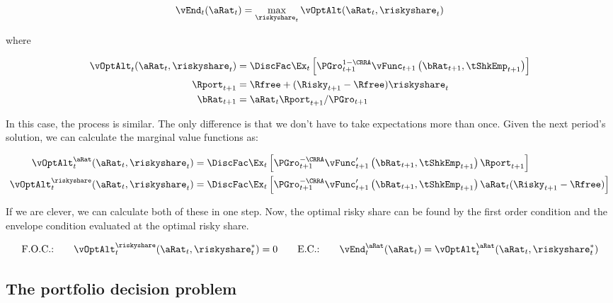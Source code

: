 \documentclass[\econtexRoot/SequentialEGM]{subfiles}
\begin{document}
\begin{equation}
        \vEnd_{t}(\aRat_{t}) = \max_{\riskyshare_{t}} \vOptAlt(\aRat_{t}, \riskyshare_{t})
\end{equation}

where

\begin{equation}
        \begin{split}
                \vOptAlt_{t}(\aRat_{t}, \riskyshare_{t}) & = \DiscFac \Ex_{t} \left[ \PGro_{t+1}^{1-\CRRA} \vFunc_{t+1}\left(\bRat_{t+1}, \tShkEmp_{t+1}\right)   \right] \\
                \Rport_{t+1} & = \Rfree + (\Risky_{t+1} - \Rfree) \riskyshare_{t} \\
                \bRat_{t+1} & = \aRat_{t} \Rport_{t+1} / \PGro_{t+1}
        \end{split}
\end{equation}

In this case, the process is similar. The only difference is that we don't have to take expectations more than once. Given the next period's solution, we can calculate the marginal value functions as:

\begin{equation}
        \begin{split}
                \vOptAlt_{t}^{\aRat}(\aRat_{t}, \riskyshare_{t}) & = \DiscFac \Ex_{t} \left[ \PGro_{t+1}^{-\CRRA} \vFunc_{t+1}'\left(\bRat_{t+1}, \tShkEmp_{t+1}\right) \Rport_{t+1}   \right] \\
                \vOptAlt_{t}^{\riskyshare}(\aRat_{t}, \riskyshare_{t}) & = \DiscFac \Ex_{t} \left[ \PGro_{t+1}^{-\CRRA} \vFunc_{t+1}'\left(\bRat_{t+1}, \tShkEmp_{t+1}\right) \aRat_{t} (\Risky_{t+1} - \Rfree)   \right] \\
        \end{split}
\end{equation}

If we are clever, we can calculate both of these in one step. Now, the optimal risky share can be found by the first order condition and the envelope condition evaluated at the optimal risky share.

\begin{equation}
        \text{F.O.C.:} \qquad \vOptAlt_{t}^{\riskyshare}(\aRat_{t}, \riskyshare_{t}^{*})  = 0 \qquad
        \text{E.C.:} \qquad \vEnd_{t}^{\aRat}(\aRat_{t}) = \vOptAlt_{t}^{\aRat}(\aRat_{t}, \riskyshare_{t}^{*})
\end{equation}

\subsection{The portfolio decision problem}
\end{document}
